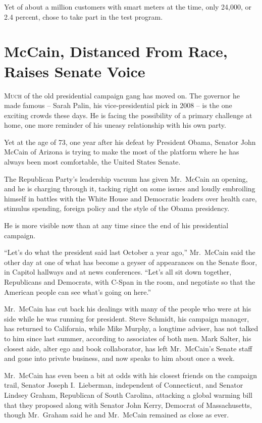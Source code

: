 ﻿\documentclass[12pt]{article}
\begin{document}
Yet of about a million customers with smart meters at the time, only 24,000, or 2.4 percent, chose
to take part in the test program.

\section{McCain, Distanced From Race, Raises Senate Voice}

\lettrine{M}{uch} of the old presidential campaign gang has moved on. The
governor he made famous -- Sarah Palin, his vice-presidential pick in 2008 -- is the one exciting
crowds these days. He is facing the possibility of a primary challenge at home, one more reminder of
his uneasy relationship with his own party.

Yet at the age of 73, one year after his defeat by President Obama, Senator John McCain of Arizona
is trying to make the most of the platform where he has always been most comfortable, the United
States Senate.

The Republican Party's leadership vacuum has given Mr.~McCain an opening, and he is charging through
it, tacking right on some issues and loudly embroiling himself in battles with the White House and
Democratic leaders over health care, stimulus spending, foreign policy and the style of the Obama
presidency.

He is more visible now than at any time since the end of his presidential campaign.

``Let's do what the president said last October a year ago,'' Mr.~McCain said the other day at one
of what has become a geyser of appearances on the Senate floor, in Capitol hallways and at news
conferences. ``Let's all sit down together, Republicans and Democrats, with C-Span in the room, and
negotiate so that the American people can see what's going on here.''

Mr.~McCain has cut back his dealings with many of the people who were at his side while he was
running for president. Steve Schmidt, his campaign manager, has returned to California, while Mike
Murphy, a longtime adviser, has not talked to him since last summer, according to associates of both
men. Mark Salter, his closest aide, alter ego and book collaborator, has left Mr.~McCain's Senate
staff and gone into private business, and now speaks to him about once a week.

Mr.~McCain has even been a bit at odds with his closest friends on the campaign trail, Senator
Joseph I.~Lieberman, independent of Connecticut, and Senator Lindsey Graham, Republican of South
Carolina, attacking a global warming bill that they proposed along with Senator John Kerry, Democrat
of Massachusetts, though Mr.~Graham said he and Mr.~McCain remained as close as ever.
\end{document}
